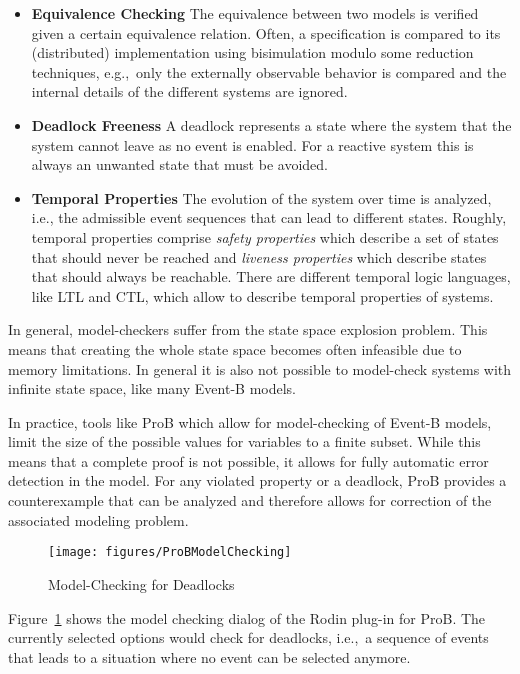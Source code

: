 \begin{itemize}
\item {\bf Equivalence Checking} The equivalence between two models is verified
  given a certain equivalence relation. Often, a specification is compared to
  its (distributed) implementation using bisimulation modulo some reduction
  techniques, e.g.,\ only the externally observable behavior is compared and the
  internal details of the different systems are ignored.
\item {\bf Deadlock Freeness} A deadlock represents a state where the system
  that the system cannot leave as no event is enabled. For a reactive system
  this is always an unwanted state that must be avoided.
\item {\bf Temporal Properties} The evolution of the system over time is
  analyzed, i.e., the admissible event sequences that can lead to different
  states. Roughly, temporal properties comprise \emph{safety properties} which
  describe a set of states that should never be reached and \emph{liveness
    properties} which describe states that should always be reachable. There are
  different temporal logic languages, like LTL and CTL, which allow to describe
  temporal properties of systems.
\end{itemize}

In general, model-checkers suffer from the state space explosion problem. This
means that creating the whole state space becomes often infeasible due to memory
limitations. In general it is also not possible to model-check systems with
infinite state space, like many Event-B models.

In practice, tools like ProB which allow for model-checking of Event-B models,
limit the size of the possible values for variables to a finite subset. While
this means that a complete proof is not possible, it allows for fully automatic
error detection in the model. For any violated property or a deadlock, ProB
provides a counterexample that can be analyzed and therefore allows for
correction of the associated modeling problem.

\begin{figure}[ht]
  \centering
  \texttt{[image: figures/ProBModelChecking]}
  \caption{Model-Checking for Deadlocks}
  \label{fig:Prob-model-check}
\end{figure}

Figure~\ref{fig:Prob-model-check} shows the model checking dialog of the Rodin
plug-in for ProB. The currently selected options would check for deadlocks,
i.e.,\ a sequence of events that leads to a situation where no event can be
selected anymore.


